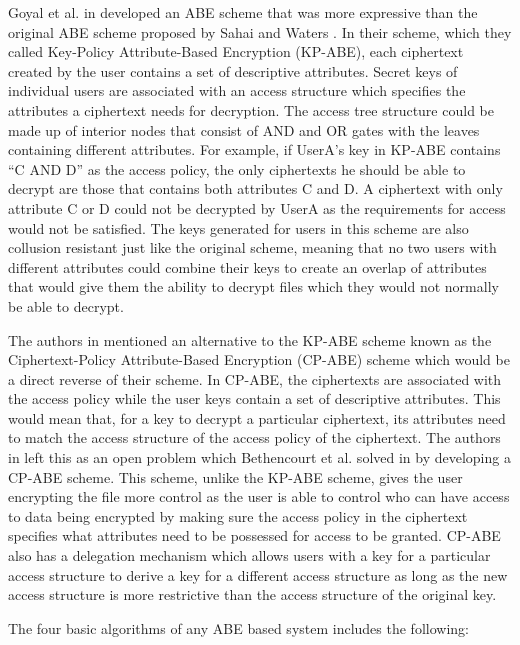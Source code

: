 Goyal et al. in \cite{Goyal2006} developed an ABE scheme that was more expressive than the original ABE scheme proposed by Sahai and Waters \cite{Sahai2005}. In their scheme, which they called Key-Policy Attribute-Based Encryption (KP-ABE), each ciphertext created by the user contains a set of descriptive attributes. Secret keys of individual users are associated with an access structure which specifies the attributes a ciphertext needs for decryption. The access tree structure could be made up of interior nodes that consist of AND and OR gates with the leaves containing different attributes. For example, if UserA’s key in KP-ABE contains “C AND D” as the access policy, the only ciphertexts he should be able to decrypt are those that contains both attributes C and D. A ciphertext with only attribute C or D could not be decrypted by UserA as the requirements for access would not be satisfied. The keys generated for users in this scheme are also collusion resistant just like the original scheme, meaning that no two users with different attributes could combine their keys to create an overlap of attributes that would give them the ability to decrypt files which they would not normally be able to decrypt.

The authors in \cite{Bethencourt2007} mentioned an alternative to the KP-ABE scheme known as the Ciphertext-Policy Attribute-Based Encryption (CP-ABE) scheme which would be a direct reverse of their scheme. In CP-ABE, the ciphertexts are associated with the access policy while the user keys contain a set of descriptive attributes. This would mean that, for a key to decrypt a particular ciphertext, its attributes need to match the access structure of the access policy of the ciphertext. The authors in \cite{Goyal2006} left this as an open problem which Bethencourt et al. solved in \cite{Bethencourt2007} by developing a CP-ABE scheme. This scheme, unlike the KP-ABE scheme, gives the user encrypting the file more control as the user is able to control who can have access to data being encrypted by making sure the access policy in the ciphertext specifies what attributes need to be possessed for access to be granted. CP-ABE also has a delegation mechanism which allows users with a key for a particular access structure to derive a key for a different access structure as long as the new access structure is more restrictive than the access structure of the original key.

The four basic algorithms of any ABE based system includes the following:

